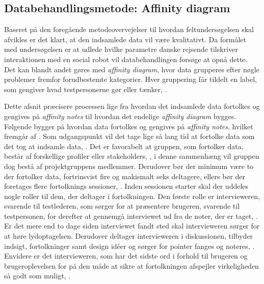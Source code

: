 \subsection{Databehandlingsmetode: Affinity diagram}
\label{ParametreMetodeovervejelserAffinityDiagram}
%
Baseret på den foregående metodeovervejelser til hvordan feltundersøgelsen skal afvikles er det klart, at den indsamlede data vil være kvalitativt. Da formålet med undersøgelsen er at udlede hvilke parametre danske rejsende tilskriver interaktionen med en social robot vil databehandlingen forsøge at opnå dette. Det kan blandt andet gøres med \textit{affinity diagram}, hvor data grupperes efter nøgle problemer fremfor forudbestemte kategorier. Hver gruppering får tildelt en label, som gengiver hvad testpersonerne gør eller tænker, \parencite[s. 159]{Book:BuildingAnAffinity}. 

Dette afsnit præcisere processen lige fra hvordan det indsamlede data fortolkes og gengives på \textit{affinity notes} til hvordan det endelige \textit{affinity diagram} bygges. \blankline
%
Følgende bygger på hvordan data fortolkes og gengives på \textit{affinity notes}, hvilket fremgår af \textcite[ss. 101-122]{Book:CIInterpretationSession}. Som udgangspunkt vil det tage lige så lang tid at fortolke data som det tog at indsamle data, \parencite[s. 102]{Book:CIInterpretationSession}. Det er favorabelt at gruppen, som fortolker data, består af forskellige profiler eller stakeholders, \parencite[s. 104]{Book:CIInterpretationSession}, i denne sammenhæng vil gruppen dog bestå af projektgruppens medlemmer. Derudover bør der minimum være to der fortolker data, fortrinsvist fire og makismalt seks deltagere, ellers bør der foretages flere fortolknings sessioner, \parencite[s. 104]{Book:CIInterpretationSession}. \blankline
%
Inden sessionen starter skal der uddeles nogle roller til dem, der deltager i fortolkningen. Den første rolle er intervieweren, svarende til testlederen, som sørger for at præsentere brugeren, svarende til testpersonen, for derefter at gennemgå interviewet ud fra de noter, der er taget, \parencite[ss. 106-107]{Book:CIInterpretationSession}. Er det mere end to dage siden interviewet fandt sted skal intervieweren sørger for at høre lydoptagelsen. Derudover deltager intervieweren i diskussionen, tilbyder indsigt, fortolkninger samt design idéer og sørger for pointer fanges og noteres, \parencite[s. 107]{Book:CIInterpretationSession}. Envidere er det intervieweren, som har det sidste ord i forhold til brugeren og brugeroplevelsen for på den måde at sikre at fortolkningen afspejler virkeligheden så godt som muligt, \parencite[s. 107]{Book:CIInterpretationSession}.

